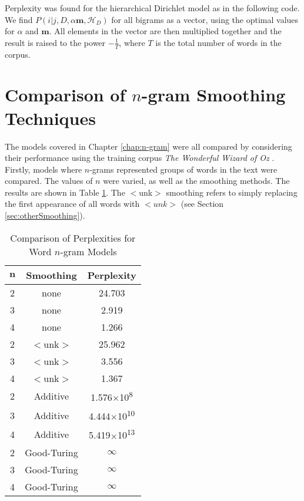 Perplexity was found for the hierarchical Dirichlet model as in the following code. We find $P(i|j,D,\alpha\boldsymbol{m},\mathscr{H}_{D})$ for all bigrams as a vector, using the optimal values for $\alpha$ and $\boldsymbol{m}$. All elements in the vector are then multiplied together and the result is raised to the power $-\frac{1}{T}$, where $T$ is the total number of words in the corpus.




\section{Comparison of $n$-gram Smoothing Techniques}

The models covered in Chapter \ref{chap:n-gram} were all compared by considering their performance using the training corpus \textit{The Wonderful Wizard of Oz} \cite{baum2008wonderful}. Firstly, models where $n$-grams represented groups of words in the text were compared. The values of $n$ were varied, as well as the smoothing methods. The results are shown in Table \ref{table:wordNGram}. The $<$unk$>$ smoothing refers to simply replacing the first appearance of all words with $<unk>$ (see Section \ref{sec:otherSmoothing}).

\begin{table}[h!]
\caption{Comparison of Perplexities for Word $n$-gram Models}
\label{table:wordNGram}
\begin{center}
    \begin{tabular}{|c| c| c|}
    \hline
    $\boldsymbol{n}$ & \textbf{Smoothing} & \textbf{Perplexity} \\ \hline
    2 & none & 24.703 \\ \hline
    3 & none & 2.919 \\ \hline
    4 & none & 1.266 \\ \hline
    2 & $<$unk$>$ & 25.962 \\ \hline
    3 & $<$unk$>$ & 3.556 \\ \hline
    4 & $<$unk$>$ & 1.367 \\ \hline
    2 & Additive & 1.576$\times$10\textsuperscript{8} \\ \hline
    3 & Additive & 4.444$\times$10\textsuperscript{10} \\ \hline
    4 & Additive & 5.419$\times$10\textsuperscript{13} \\ \hline
    2 & Good-Turing & $\infty$ \\ \hline
    3 & Good-Turing & $\infty$ \\ \hline
    4 & Good-Turing& $\infty$ \\ \hline
    \end{tabular}
    \end{center}
    \end{table}

